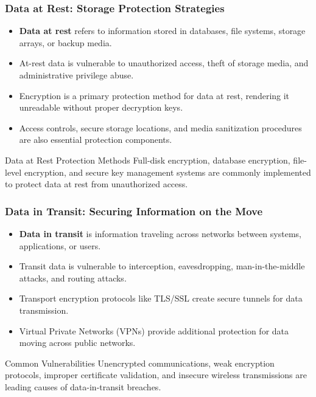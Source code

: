 \documentclass{beamer}
\begin{document}
\begin{frame}
\frametitle{Data at Rest: Storage Protection Strategies}
\begin{itemize}
\item \textbf{Data at rest} refers to information stored in databases, file systems, storage arrays, or backup media.
\item At-rest data is vulnerable to unauthorized access, theft of storage media, and administrative privilege abuse.
\item Encryption is a primary protection method for data at rest, rendering it unreadable without proper decryption keys.
\item Access controls, secure storage locations, and media sanitization procedures are also essential protection components.
\end{itemize}

\begin{exampleblock}{Data at Rest Protection Methods}
Full-disk encryption, database encryption, file-level encryption, and secure key management systems are commonly implemented to protect data at rest from unauthorized access.
\end{exampleblock}
\end{frame}

\begin{frame}
\frametitle{Data in Transit: Securing Information on the Move}
\begin{itemize}
\item \textbf{Data in transit} is information traveling across networks between systems, applications, or users.
\item Transit data is vulnerable to interception, eavesdropping, man-in-the-middle attacks, and routing attacks.
\item Transport encryption protocols like TLS/SSL create secure tunnels for data transmission.
\item Virtual Private Networks (VPNs) provide additional protection for data moving across public networks.
\end{itemize}

\begin{alertblock}{Common Vulnerabilities}
Unencrypted communications, weak encryption protocols, improper certificate validation, and insecure wireless transmissions are leading causes of data-in-transit breaches.
\end{alertblock}
\end{frame}
\end{document}
